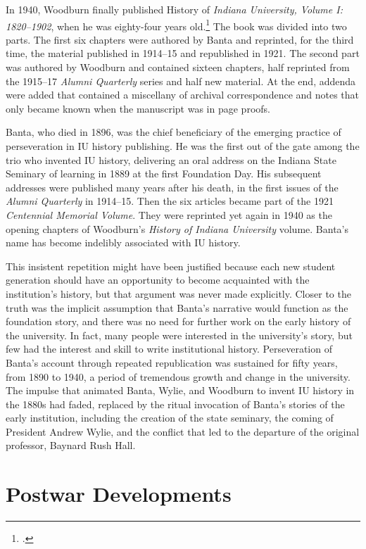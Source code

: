 \documentclass[
  american,
  letterpaper,
]{scrreprt}
\begin{document}
In 1940, Woodburn finally published History of \emph{Indiana University,
Volume I: 1820--1902}, when he was eighty-four years old.\footnote{.} The book was divided
into two parts. The first six chapters were authored by Banta and
reprinted, for the third time, the material published in 1914--15 and
republished in 1921. The second part was authored by Woodburn and
contained sixteen chapters, half reprinted from the 1915--17
\emph{Alumni Quarterly} series and half new material. At the end,
addenda were added that contained a miscellany of archival
correspondence and notes that only became known when the manuscript was
in page proofs.

Banta, who died in 1896, was the chief beneficiary of the emerging
practice of perseveration in IU history publishing. He was the first out
of the gate among the trio who invented IU history, delivering an oral
address on the Indiana State Seminary of learning in 1889 at the first
Foundation Day. His subsequent addresses were published many years after
his death, in the first issues of the \emph{Alumni Quarterly} in
1914--15. Then the six articles became part of the 1921 \emph{Centennial
Memorial Volume}. They were reprinted yet again in 1940 as the opening
chapters of Woodburn's \emph{History of Indiana University} volume.
Banta's name has become indelibly associated with IU history.

This insistent repetition might have been justified because each new
student generation should have an opportunity to become acquainted with
the institution's history, but that argument was never made explicitly.
Closer to the truth was the implicit assumption that Banta's narrative
would function as the foundation story, and there was no need for
further work on the early history of the university. In fact, many
people were interested in the university's story, but few had the
interest and skill to write institutional history. Perseveration of
Banta's account through repeated republication was sustained for fifty
years, from 1890 to 1940, a period of tremendous growth and change in
the university. The impulse that animated Banta, Wylie, and Woodburn to
invent IU history in the 1880s had faded, replaced by the ritual
invocation of Banta's stories of the early institution, including the
creation of the state seminary, the coming of President Andrew Wylie,
and the conflict that led to the departure of the original professor,
Baynard Rush Hall.

\section{Postwar Developments}\label{postwar-developments}
\end{document}
